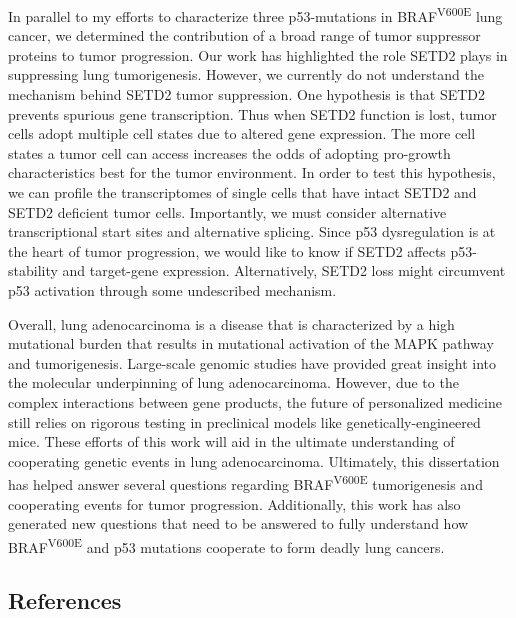 In parallel to my efforts to characterize three p53-mutations in BRAF\textsuperscript{V600E} lung cancer, we determined the contribution of a broad range of tumor suppressor proteins to tumor progression. Our work has highlighted the role SETD2 plays in suppressing lung tumorigenesis. However, we currently do not understand the mechanism behind SETD2 tumor suppression. One hypothesis is that SETD2 prevents spurious gene transcription. Thus when SETD2 function is lost, tumor cells adopt multiple cell states due to altered gene expression. The more cell states a tumor cell can access increases the odds of adopting pro-growth characteristics best for the tumor environment. In order to test this hypothesis, we can profile the transcriptomes of single cells that have intact SETD2 and SETD2 deficient tumor cells. Importantly, we must consider alternative transcriptional start sites and alternative splicing. Since p53 dysregulation is at the heart of tumor progression, we would like to know if SETD2 affects p53-stability and target-gene expression. Alternatively, SETD2 loss might circumvent p53 activation through some undescribed mechanism.

Overall, lung adenocarcinoma is a disease that is characterized by a high mutational burden that results in mutational activation of the MAPK pathway and tumorigenesis. Large-scale genomic studies have provided great insight into the molecular underpinning of lung adenocarcinoma. However, due to the complex interactions between gene products, the future of personalized medicine still relies on rigorous testing in preclinical models like genetically-engineered mice. These efforts of this work will aid in the ultimate understanding of cooperating genetic events in lung adenocarcinoma. Ultimately, this dissertation has helped answer several questions regarding BRAF\textsuperscript{V600E} tumorigenesis and cooperating events for tumor progression. Additionally, this work has also generated new questions that need to be answered to fully understand how BRAF\textsuperscript{V600E} and p53 mutations cooperate to form deadly lung cancers.

\hypertarget{references}{%
\subsection{References}\label{references}}

